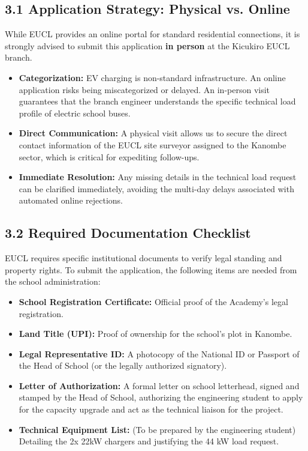 \documentclass[11pt,a4paper]{article}
\begin{document}
\subsection{3.1 Application Strategy: Physical vs. Online}
While EUCL provides an online portal for standard residential connections, it is strongly advised to submit this application \textbf{in person} at the Kicukiro EUCL branch. 

\begin{itemize}
    \item \textbf{Categorization:} EV charging is non-standard infrastructure. An online application risks being miscategorized or delayed. An in-person visit guarantees that the branch engineer understands the specific technical load profile of electric school buses.
    \item \textbf{Direct Communication:} A physical visit allows us to secure the direct contact information of the EUCL site surveyor assigned to the Kanombe sector, which is critical for expediting follow-ups.
    \item \textbf{Immediate Resolution:} Any missing details in the technical load request can be clarified immediately, avoiding the multi-day delays associated with automated online rejections.
\end{itemize}

\subsection{3.2 Required Documentation Checklist}
EUCL requires specific institutional documents to verify legal standing and property rights. To submit the application, the following items are needed from the school administration:

\begin{itemize}[label=$\square$]
    \item \textbf{School Registration Certificate:} Official proof of the Academy's legal registration.
    \item \textbf{Land Title (UPI):} Proof of ownership for the school's plot in Kanombe.
    \item \textbf{Legal Representative ID:} A photocopy of the National ID or Passport of the Head of School (or the legally authorized signatory).
    \item \textbf{Letter of Authorization:} A formal letter on school letterhead, signed and stamped by the Head of School, authorizing the engineering student to apply for the capacity upgrade and act as the technical liaison for the project.
    \item \textbf{Technical Equipment List:} (To be prepared by the engineering student) Detailing the 2x 22kW chargers and justifying the 44 kW load request.
\end{itemize}
\end{document}
